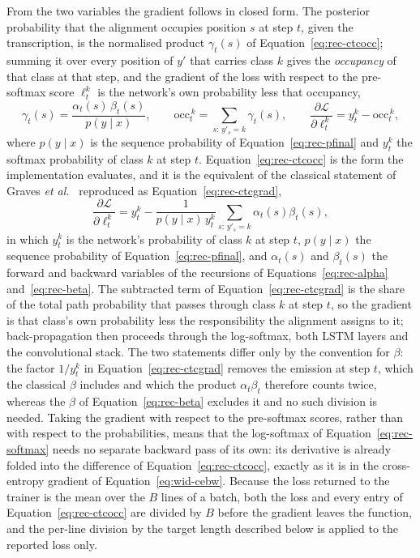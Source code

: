 From the two variables the gradient follows in closed form. The posterior probability that the alignment occupies position $s$ at step $t$, given the transcription, is the normalised product $\gamma_t(s)$ of Equation~\ref{eq:rec-ctcocc}; summing it over every position of $y'$ that carries class $k$ gives the \emph{occupancy} of that class at that step, and the gradient of the loss with respect to the pre-softmax score $\ell_t^k$ is the network's own probability less that occupancy,
\begin{equation}
\gamma_t(s)=\frac{\alpha_t(s)\,\beta_t(s)}{p(y\mid x)},\qquad \mathrm{occ}_t^{\,k}=\sum_{s:\,y'_s=k}\gamma_t(s),\qquad \frac{\partial\mathcal L}{\partial\ell_t^{k}}=y_t^k-\mathrm{occ}_t^{\,k},
\label{eq:rec-ctcocc}
\end{equation}
where $p(y\mid x)$ is the sequence probability of Equation~\ref{eq:rec-pfinal} and $y_t^k$ the softmax probability of class $k$ at step $t$.
Equation~\ref{eq:rec-ctcocc} is the form the implementation evaluates, and it is the equivalent of the classical statement of Graves \emph{et al.}~\cite{graves2006} reproduced as Equation~\ref{eq:rec-ctcgrad},
\begin{equation}
\frac{\partial\mathcal L}{\partial\ell_t^{k}}=y_t^k-\frac{1}{p(y\mid x)\,y_t^k}\sum_{s:\,y'_s=k}\alpha_t(s)\beta_t(s),
\label{eq:rec-ctcgrad}
\end{equation}
in which $y_t^k$ is the network's probability of class $k$ at step $t$, $p(y\mid x)$ the sequence probability of Equation~\ref{eq:rec-pfinal}, and $\alpha_t(s)$ and $\beta_t(s)$ the forward and backward variables of the recursions of Equations~\ref{eq:rec-alpha} and~\ref{eq:rec-beta}.
The subtracted term of Equation~\ref{eq:rec-ctcgrad} is the share of the total path probability that passes through class $k$ at step $t$, so the gradient is that class's own probability less the responsibility the alignment assigns to it; back-propagation then proceeds through the log-softmax, both LSTM layers and the convolutional stack.
The two statements differ only by the convention for $\beta$: the factor $1/y_t^k$ in Equation~\ref{eq:rec-ctcgrad} removes the emission at step $t$, which the classical $\beta$ includes and which the product $\alpha_t\beta_t$ therefore counts twice, whereas the $\beta$ of Equation~\ref{eq:rec-beta} excludes it and no such division is needed.
Taking the gradient with respect to the pre-softmax scores, rather than with respect to the probabilities, means that the log-softmax of Equation~\ref{eq:rec-softmax} needs no separate backward pass of its own: its derivative is already folded into the difference of Equation~\ref{eq:rec-ctcocc}, exactly as it is in the cross-entropy gradient of Equation~\ref{eq:wid-cebw}.
Because the loss returned to the trainer is the mean over the $B$ lines of a batch, both the loss and every entry of Equation~\ref{eq:rec-ctcocc} are divided by $B$ before the gradient leaves the function, and the per-line division by the target length described below is applied to the reported loss only.

